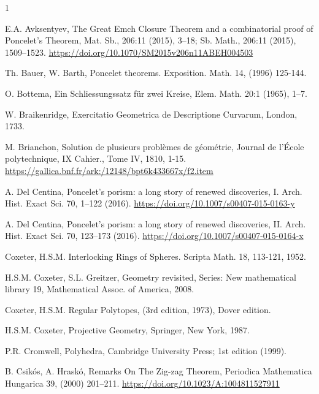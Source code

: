 \documentclass{birkjour}
\theoremstyle{definition}
\theoremstyle{remark}
\numberwithin{equation}{section}
\begin{document}
\begin{thebibliography}{1}

\normalsize
\baselineskip=17pt
 {\footnotesize

 E.A. Avksentyev, The Great Emch Closure Theorem and a combinatorial proof of Poncelet's Theorem, Mat. Sb., 206:11 (2015), 3–18; Sb. Math., 206:11 (2015), 1509–1523. \url{ https://doi.org/10.1070/SM2015v206n11ABEH004503}

 Th. Bauer, W. Barth,
Poncelet theorems.
Exposition. Math. 14, (1996) 125-144.

 O. Bottema, Ein Schliessungssatz für zwei Kreise, Elem. Math. 20:1 (1965), 1–7.

 W. Braikenridge, Exercitatio Geometrica de Descriptione Curvarum, London, 1733.

 M. Brianchon, Solution de plusieurs problèmes de géométrie, Journal de l'École polytechnique, IX Cahier., Tome IV, 1810, 1-15. \url{https://gallica.bnf.fr/ark:/12148/bpt6k433667x/f2.item}

 A. Del Centina, Poncelet’s porism: a long story of renewed discoveries, I. Arch. Hist. Exact Sci. 70, 1–122 (2016). \url{https://doi.org/10.1007/s00407-015-0163-y}

 A. Del Centina, Poncelet’s porism: a long story of renewed discoveries, II. Arch. Hist. Exact Sci. 70, 123–173 (2016). \url{https://doi.org/10.1007/s00407-015-0164-x}

Coxeter, H.S.M. Interlocking Rings of Spheres. Scripta Math. 18, 113-121, 1952.

 H.S.M. Coxeter, S.L. Greitzer,  Geometry revisited, Series:
New mathematical library 19, Mathematical Assoc. of America, 2008.

Coxeter, H.S.M. Regular Polytopes, (3rd edition, 1973), Dover edition.

 H.S.M. Coxeter, Projective Geometry,
Springer, New York, 1987.

 P.R. Cromwell, Polyhedra, Cambridge University Press; 1st edition (1999).

 B. Csikós, A. Hraskó, Remarks On The Zig-zag Theorem, Periodica Mathematica Hungarica 39, (2000) 201–211. \url{https://doi.org/10.1023/A:1004811527911}

}
\end{thebibliography}
\end{document}
